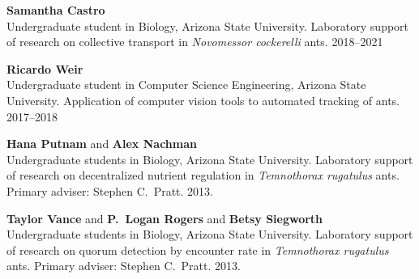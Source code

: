 \documentclass[10pt]{article}
\begin{document}
\begin{outerlist}


    \item \textbf{Samantha Castro}\\
        Undergraduate student in Biology, Arizona State University.
        Laboratory support of research on collective transport in
        \emph{Novomessor cockerelli} ants.
        2018--2021

    \item \textbf{Ricardo Weir}\\
        Undergraduate student in Computer Science Engineering, Arizona State University.
        Application of computer vision tools to automated tracking of
        ants.
        2017--2018

    \item \textbf{Hana Putnam} and \textbf{Alex Nachman}\\
        Undergraduate students in Biology, Arizona State University.
        Laboratory support of research on decentralized nutrient
        regulation in \emph{Temnothorax rugatulus} ants.
        Primary adviser: Stephen C.~Pratt.
        2013.

    \item \textbf{Taylor Vance} and \textbf{P.~Logan Rogers}
        and \textbf{Betsy Siegworth}\\
        Undergraduate students in Biology, Arizona State University.
        Laboratory support of research on quorum detection by encounter
        rate in \emph{Temnothorax rugatulus} ants.
        Primary adviser: Stephen C.~Pratt.
        2013.





\end{outerlist}
\end{document}
